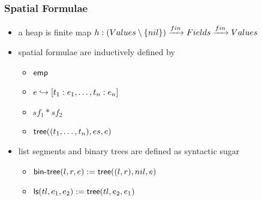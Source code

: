 \begin{frame}
\frametitle{Spatial Formulae}
\begin{itemize}
\item a \alert{heap} is finite map $h : (Values \setminus \{nil\}) \xrightarrow{fin} Fields \xrightarrow{fin} Values$
\item \alert{spatial formulae} are inductively defined by
\begin{itemize}
\item ${\textsf{emp}}$
\item $e \hookrightarrow [t_1:e_1, \ldots, t_n : e_n]$
\item $sf_1 * sf_2$
\item ${\textsf{tree}}((t_1, \ldots, t_n), es, e)$
\end{itemize}
\item list segments and binary trees are defined as syntactic sugar
\begin{itemize}
\item ${\textsf{bin-tree}}(l, r, e) := {\textsf{tree}}((l,r), nil, e)$
\item ${\textsf{ls}}(tl, e_1, e_2) := {\textsf{tree}}(tl, e_2, e_1)$
\end{itemize}
\end{itemize}
\end{frame}


